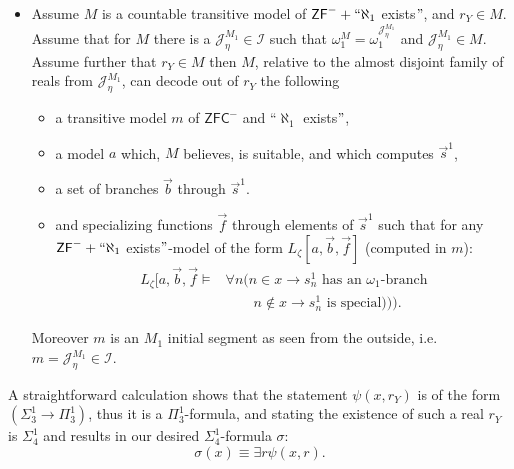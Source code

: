 \documentclass[a4paper,11pt]{article}
\newcommand{\ZFC}{\mathsf{ZFC}}
\newcommand{\ZFP}{\mathsf{ZF}^-}
\begin{document}
\begin{itemize}
\item[] Assume $M$ is a countable transitive model of $\ZFP+ ``\aleph_1$ exists$"$, and $r_Y \in M$. Assume that for $M$ 
there is a $\mathcal{J}^{M_1}_{\eta} \in \mathcal{I}$ such that $\omega_1^M=\omega_1^{\mathcal{J}^{M_1}_{\eta}}$ and $\mathcal{J}^{M_1}_{\eta} \in M$.  Assume further that $r_Y \in M$ then $M$, relative to the almost disjoint family of reals from $\mathcal{J}^{M_1}_{\eta}$, can decode out of  $r_Y$ the following
\begin{itemize}
\item a transitive model $m$ of $\ZFC^-$ and ``$\aleph_1$ exists$"$,
\item a model $a$ which, $M$ believes, is suitable, and which computes $\vec{s}^1$,
\item a set of branches $\vec{b}$ through $\vec{s}^1$.
\item and specializing functions $\vec{f}$ through elements of $\vec{s}^1$ such that for any $\ZFP+ ``\aleph_1$ exists$"$-model of the form $L_{\zeta} [a,\vec{b},\vec{f}]$ (computed in $m$):
\begin{align*}
L_{\zeta} [a,\vec{b},\vec{f} \models &\forall n ( n \in x \rightarrow s^1_{n}  \text{ has an $\omega_1$-branch}  \\&
		 \qquad   	n \notin x \rightarrow s^1_{n}  \text{ is special})) ).
\end{align*}



\end{itemize}
Moreover $m$ is an $M_1$ initial segment as seen from the outside, i.e. $m = \mathcal{J}^{M_1}_{\eta} \in \mathcal{I}$.
\end{itemize}
A straightforward calculation shows that the statement $\psi(x,r_Y)$ is of the form $ (\Sigma^1_3 \rightarrow \Pi^1_3)$, thus it is a $\Pi^1_3$-formula, and stating the existence of such a real $r_Y$ is $\Sigma^1_4$ and results in our desired $\Sigma^1_4$-formula $\sigma$:
\[ \sigma(x) \equiv \exists r \psi (x,r). \]
\end{document}
